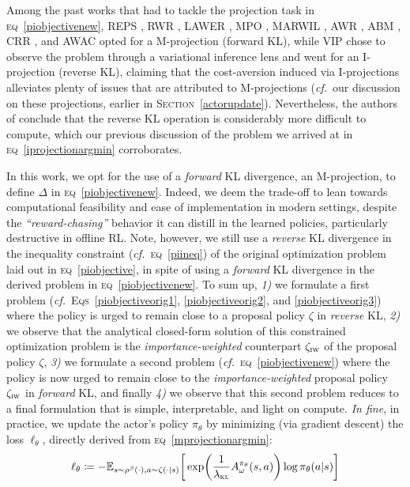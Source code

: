 Among the past works that had to tackle the projection task in \textsc{eq}~\ref{piobjectivenew},
REPS \cite{Peters2010-vd},
RWR \cite{Peters2007-qb, Kober2010-hy},
LAWER \cite{Neumann2008-tm},
MPO \cite{Abdolmaleki2018-sp},
MARWIL \cite{Wang2018-dn},
AWR \cite{Peng2019-hu},
ABM \cite{Siegel2020-lo},
CRR \cite{Wang2020-sr},
and AWAC \cite{Nair2020-gd}
opted for a M-projection (forward KL), while VIP \cite{Neumann2011-hn}
chose to observe the problem through a variational inference lens and
went for an I-projection (reverse KL),
claiming that the cost-aversion induced via I-projections
alleviates plenty of issues that are attributed to M-projections
(\textit{cf.}~our discussion on these projections, earlier in \textsc{Section}~\ref{actorupdate}).
Nevertheless, the authors of \cite{Neumann2011-hn}
conclude that the reverse KL operation is considerably more difficult to compute,
which our previous discussion of the problem we arrived at in \textsc{eq}~\ref{iprojectionargmin}
corroborates.

In this work, we opt for the use of a \emph{forward} KL divergence, an M-projection, to define $\Delta$
in \textsc{eq}~\ref{piobjectivenew}. Indeed, we deem the trade-off to lean towards
computational feasibility and ease of implementation in modern settings,
despite the \emph{``reward-chasing''} behavior it can distill in the learned policies,
particularly destructive in offline RL.
Note, however, we still use a \emph{reverse} KL divergence
in the inequality constraint (\textit{cf.}~\textsc{eq}~\ref{piineq})
of the original optimization problem laid out in \textsc{eq}~\ref{piobjective},
in spite of using a \emph{forward} KL divergence in
the derived problem in \textsc{eq}~\ref{piobjectivenew}.
To sum up,
\textit{1)} we formulate a first problem (\textit{cf.}~\textsc{Eqs}~\ref{piobjectiveorig1},
\ref{piobjectiveorig2}, and \ref{piobjectiveorig3})
where the policy is urged to remain close to a proposal policy $\zeta$
in \emph{reverse} KL,
\textit{2)} we observe that the analytical closed-form solution of this constrained optimization problem
is the \emph{importance-weighted} counterpart $\zeta_\textsc{iw}$ of the proposal policy $\zeta$,
\textit{3)} we formulate a second problem (\textit{cf.}~\textsc{eq}~\ref{piobjectivenew})
where the policy is now urged to remain close to the
\emph{importance-weighted} proposal policy $\zeta_\textsc{iw}$
in \emph{forward} KL, and finally
\textit{4)} we observe that this second problem reduces to a final formulation that is simple, interpretable, and
light on compute.
\textit{In fine},
in practice, we update the actor's policy $\pi_\theta$ by minimizing
(via gradient descent) the loss $\ell_\theta$,
directly derived from \textsc{eq}~\ref{mprojectionargmin}:
\begin{align}
  \ell_\theta \coloneqq -
  \mathbb{E}_{s \sim \rho^\beta(\cdot), a \sim \zeta(\cdot | s)}
  \bigg[
  \exp (\frac{1}{\lambda_\textsc{kl}} A^{\pi_\theta}_\omega(s,a)) \log \pi_\theta(a | s)
  \bigg]
  \label{actorloss}
\end{align}

